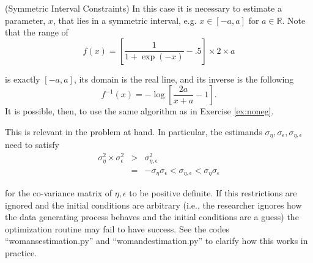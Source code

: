 \begin{example} (Symmetric Interval Constraints)
In this case it is necessary to estimate a parameter, $x$, that lies in a symmetric interval, e.g. $x \in [-a,a]$ for  $a \in \mathbb{R}$. Note that the range of
\begin{equation}
f(x) = \left[ \frac{1}{1+ \exp(-x)} -.5 \right] \times 2 \times a
\end{equation}

\noindent is exactly $[-a,a]$, its domain is the real line, and its inverse is the following 
\begin{equation}
f^{-1}(x) = - \log \left[ \frac{2a}{x+a} - 1 \right].
\end{equation}
\noindent It is possible, then, to use the same algorithm as in Exercise \ref{ex:noneg}.
\end{example}

This is relevant in the problem at hand. In particular, the estimands $\sigma_{\eta},\sigma_{\epsilon},\sigma_{\eta,\epsilon}$ need to satisfy
\begin{eqnarray}
\sigma_{\eta}^2 \times \sigma_{\epsilon}^2 &>& \sigma_{\eta,\epsilon}^2 \nonumber \\
&=& -\sigma_{\eta} \sigma_{\epsilon} < \sigma_{\eta,\epsilon} < \sigma_{\eta} \sigma_{\epsilon}
\end{eqnarray}

\noindent for the co-variance matrix of $\eta,\epsilon$ to be positive definite. If this restrictions are ignored and the initial conditions are arbitrary (i.e., the researcher ignores how the data generating process behaves and the initial conditions are a guess) the optimization routine may fail to have success. See the codes ``womansestimation.py'' and ``womandestimation.py'' to clarify how this works in practice.

